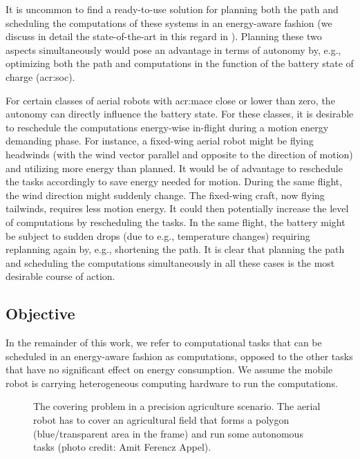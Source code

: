 It is uncommon to find a ready-to-use solution for planning both the path and scheduling the computations of these systems in an energy-aware fashion (we discuss in detail the state-of-the-art in this regard in ). Planning these two aspects simultaneously would pose an advantage in terms of autonomy by, e.g., optimizing both the path and computations in the function of the battery state of charge (\Gls{acr:soc}). 

For certain classes of aerial robots with \Gls{acr:mace} close or lower than zero, the autonomy can directly influence the battery state. For these classes, it is desirable to reschedule the computations energy-wise in-flight during a motion energy demanding phase. For instance, a fixed-wing aerial robot might be flying headwinds (with the wind vector parallel and opposite to the direction of motion) and utilizing more energy than planned. It would be of advantage to reschedule the tasks accordingly to save energy needed for motion. During the same flight, the wind direction might suddenly change. The fixed-wing craft, now flying tailwinds, requires less motion energy. It could then potentially increase the level of computations by rescheduling the tasks. In the same flight, the battery might be subject to sudden drops (due to e.g., temperature changes) requiring replanning again by, e.g., shortening the path. It is clear that planning the path and scheduling the computations simultaneously in all these cases is the most desirable course of action.

\subsection{Objective}

In the remainder of this work, we refer to computational tasks that can be scheduled in an energy-aware fashion as computations, opposed to the other tasks that have no significant effect on energy consumption. We assume the mobile robot is carrying heterogeneous computing hardware to run the computations.

\begin{figure}[t!]
  \centering
  
  \caption[The covering problem in a precision agriculture scenario]{The covering problem in a precision agriculture scenario. The aerial robot has to cover an agricultural field that forms a polygon (blue/transparent area in the frame) and run some autonomous tasks {\scriptsize(photo credit: Amit Ferencz Appel)}.}
  \label{fig:plot2}
\end{figure}

